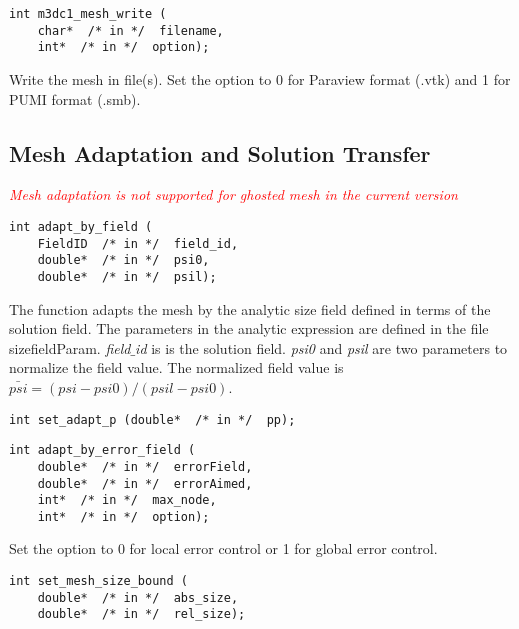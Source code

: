 \begin{verbatim}
int m3dc1_mesh_write (
    char*  /* in */  filename, 
    int*  /* in */  option);
\end{verbatim}\vspace{-.5cm}\hspace{1cm}
Write the mesh in file(s). Set the option to 0 for Paraview format (.vtk) and 1 for PUMI format (.smb).

\subsection{Mesh Adaptation and Solution Transfer}

\textcolor{red}{\textit{Mesh adaptation is not supported for ghosted mesh in the current version}}

\begin{verbatim}
int adapt_by_field (
    FieldID  /* in */  field_id, 
    double*  /* in */  psi0,  
    double*  /* in */  psil); 
\end{verbatim}\vspace{-.5cm}\hspace{1cm}
The function adapts the mesh by the analytic size field defined in terms of  the solution field. The parameters in the analytic expression are defined in the file sizefieldParam. \textit{field$\_$id} is is the solution field. \textit{psi0} and \textit{psil} are two parameters to normalize the field value. The normalized field value is $\bar{psi} = (psi - psi0)/(psil - psi0)$.

\begin{verbatim}
int set_adapt_p (double*  /* in */  pp);
\end{verbatim}\vspace{-.5cm}\hspace{1cm}

\begin{verbatim}
int adapt_by_error_field (
    double*  /* in */  errorField, 
    double*  /* in */  errorAimed, 
    int*  /* in */  max_node, 
    int*  /* in */  option); 
\end{verbatim}\vspace{-.5cm}\hspace{1cm}
Set the option to 0 for local error control or 1 for global error control.

\begin{verbatim}
int set_mesh_size_bound (
    double*  /* in */  abs_size, 
    double*  /* in */  rel_size);
\end{verbatim}\vspace{-.5cm}\hspace{1cm}

